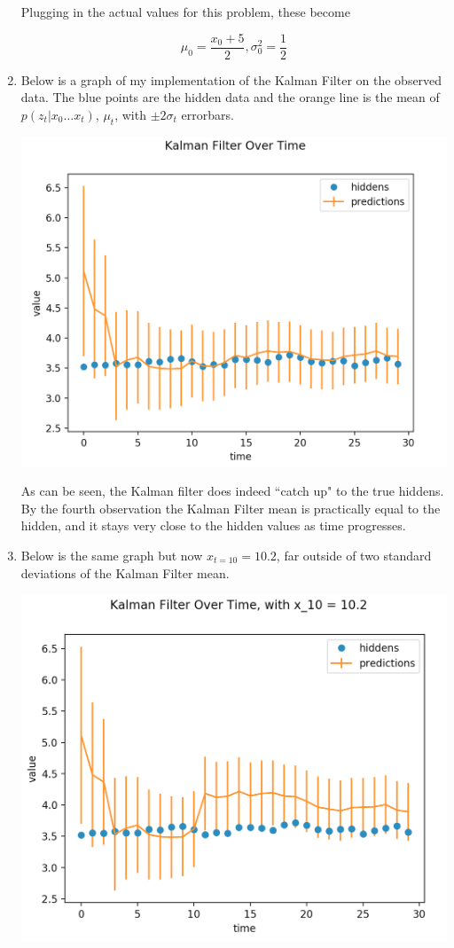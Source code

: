 \documentclass[submit]{harvardml}
\begin{document}
\begin{enumerate}
Plugging in the actual values for this problem, these become 

$$\boxed{\mu_0 = \frac{x_0 + 5}{2}, \sigma^2_0 =  \frac{1}{2}}$$

\item Below is a graph of my implementation of the Kalman Filter on the observed data. The blue points are the hidden data and the orange line is the mean of $p(z_t|x_0\dots x_t)$, $\mu_t$, with $\pm 2\sigma_t$ errorbars. 

\begin{center}
\includegraphics[scale=0.7]{2_2.png}
\end{center}

As can be seen, the Kalman filter does indeed ``catch up" to the true hiddens. By the fourth observation the Kalman Filter mean is practically equal to the hidden, and it stays very close to the hidden values as time progresses.

\item Below is the same graph but now $x_{t=10} = 10.2$, far outside of two standard deviations of the Kalman Filter mean. 

\begin{center}
\includegraphics[scale=0.7]{2_3.png}
\end{center}


\end{enumerate}
\end{document}
